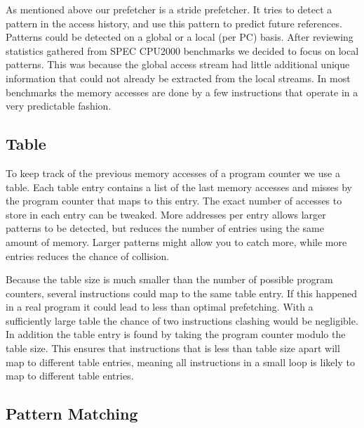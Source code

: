 As mentioned above our prefetcher is a stride prefetcher. It tries to detect a
pattern in the access history, and use this pattern to predict future
references. Patterns could be detected on a global or a local (per PC) basis.
After reviewing statistics gathered from SPEC CPU2000 benchmarks we decided to
focus on local patterns. This was because the global access stream had little 
additional unique information that could not already be extracted from the 
local streams. In most benchmarks the memory accesses are done by a few 
instructions that operate in a very predictable fashion.

\subsection{Table}

To keep track of the previous memory accesses of a program counter we use a
table. Each table entry contains a list of the last memory accesses
and misses by the program counter that maps to this entry.
The exact number of accesses to store in each entry can be tweaked.
More addresses per entry allows larger patterns to be detected,
but reduces the number of entries using the same amount of memory.
Larger patterns might allow you to catch more, while more entries
reduces the chance of collision.

Because the table size is much smaller
than the number of possible program counters, several instructions could map to
the same table entry. If this happened in a real program it could lead to less
than optimal prefetching. With a sufficiently large table the chance of two
instructions clashing would be negligible. In addition the table entry is found
by taking the program counter modulo the table size. This ensures that
instructions that is less than table size apart will map to different table
entries, meaning all instructions in a small loop is likely to map to different
table entries.

\subsection{Pattern Matching}

